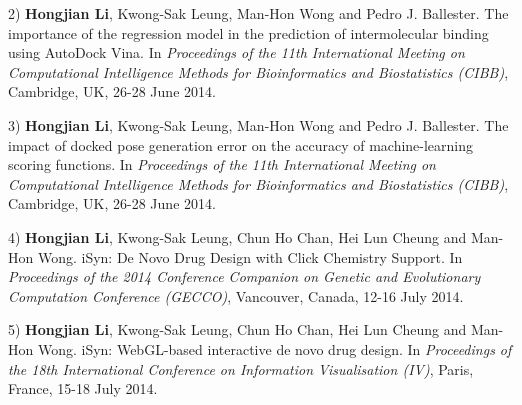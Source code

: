 2) \textbf{Hongjian Li}, Kwong-Sak Leung, Man-Hon Wong and Pedro J. Ballester. The importance of the regression model in the prediction of intermolecular binding using AutoDock Vina. In \textit{Proceedings of the 11th International Meeting on Computational Intelligence Methods for Bioinformatics and Biostatistics (CIBB)}, Cambridge, UK, 26-28 June 2014.

3) \textbf{Hongjian Li}, Kwong-Sak Leung, Man-Hon Wong and Pedro J. Ballester. The impact of docked pose generation error on the accuracy of machine-learning scoring functions. In \textit{Proceedings of the 11th International Meeting on Computational Intelligence Methods for Bioinformatics and Biostatistics (CIBB)}, Cambridge, UK, 26-28 June 2014.

4) \textbf{Hongjian Li}, Kwong-Sak Leung, Chun Ho Chan, Hei Lun Cheung and Man-Hon Wong. iSyn: De Novo Drug Design with Click Chemistry Support. In \textit{Proceedings of the 2014 Conference Companion on Genetic and Evolutionary Computation Conference (GECCO)}, Vancouver, Canada, 12-16 July 2014.

5) \textbf{Hongjian Li}, Kwong-Sak Leung, Chun Ho Chan, Hei Lun Cheung and Man-Hon Wong. iSyn: WebGL-based interactive de novo drug design. In \textit{Proceedings of the 18th International Conference on Information Visualisation (IV)}, Paris, France, 15-18 July 2014.

\chapterend
